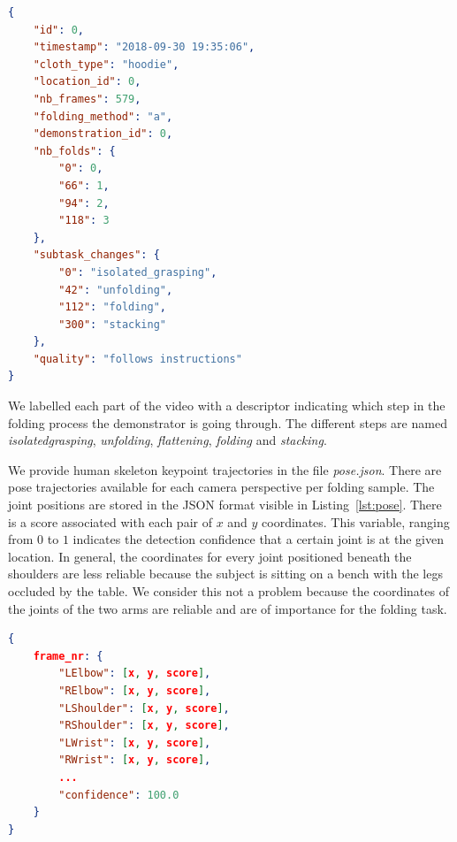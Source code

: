 \documentclass[\home/main.tex]{subfiles}
\begin{document}
\begin{lstlisting}[language=json, caption=annotations.json description, label={lst:annotations}, float,floatplacement=H, captionpos=b]
{
    "id": 0,
    "timestamp": "2018-09-30 19:35:06",
    "cloth_type": "hoodie",
    "location_id": 0,
    "nb_frames": 579,
    "folding_method": "a",
    "demonstration_id": 0,
    "nb_folds": {
        "0": 0,
        "66": 1,
        "94": 2,
        "118": 3
    },
    "subtask_changes": {
        "0": "isolated_grasping",
        "42": "unfolding",
        "112": "folding",
        "300": "stacking"
    },
    "quality": "follows instructions"
}
\end{lstlisting}

We labelled each part of the video with a descriptor indicating which step in the folding process the demonstrator is going through. The different steps are named \textit{isolated\textunderscore grasping}, \textit{unfolding}, \textit{flattening}, \textit{folding} and \textit{stacking}. 

We provide human skeleton keypoint trajectories in the file \textit{pose.json}. There are pose trajectories available for each camera perspective per folding sample. The joint positions are stored in the JSON format visible in Listing~\ref{lst:pose}. There is a score associated with each pair of $x$ and $y$ coordinates. This variable, ranging from $0$ to $1$ indicates the detection confidence that a certain joint is at the given location. In general, the coordinates for every joint positioned beneath the shoulders are less reliable because the subject is sitting on a bench with the legs occluded by the table. We consider this not a problem because the coordinates of the joints of the two arms are reliable and are of importance for the folding task. 


\begin{lstlisting}[language=json, caption=pose.json description, label={lst:pose}, captionpos=b]
{
    frame_nr: {
        "LElbow": [x, y, score],
        "RElbow": [x, y, score],
        "LShoulder": [x, y, score],
        "RShoulder": [x, y, score],
        "LWrist": [x, y, score],
        "RWrist": [x, y, score],
        ... 
        "confidence": 100.0
    }
}
\end{lstlisting}


\end{document}
